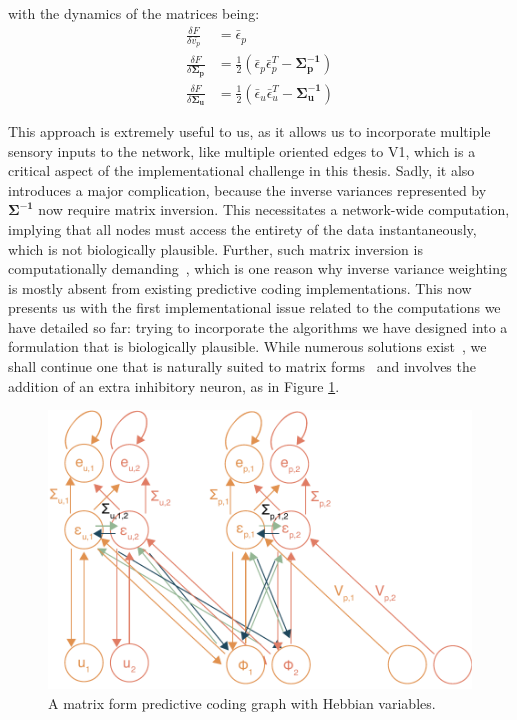 with the dynamics of the matrices being:
\begin{equation}
\label{eq_pc_matrix}
    \begin{aligned}
        \frac{\delta F}{\delta \bar{v_p}} &= \bar{\epsilon}_p \\
        \frac{\delta F}{\delta \boldsymbol{\Sigma_p}} &= \frac{1}{2}(\bar{\epsilon}_p\bar{\epsilon}_p^T - \boldsymbol{\Sigma_p^{-1}}) \\
        \frac{\delta F}{\delta \boldsymbol{\Sigma_u}} &= \frac{1}{2}(\bar{\epsilon}_u\bar{\epsilon}_u^T - \boldsymbol{\Sigma_u^{-1}})
    \end{aligned}
\end{equation}

This approach is extremely useful to us, as it allows us to incorporate multiple sensory inputs to the network, like multiple oriented edges to \gls{V1}, which is a critical aspect of the implementational challenge in this thesis. Sadly, it also introduces a major complication, because the inverse variances represented by $\boldsymbol{\Sigma^{-1}}$ now require matrix inversion. This necessitates a network-wide computation, implying that all nodes must access the entirety of the data instantaneously, which is not biologically plausible. Further, such matrix inversion is computationally demanding~\cite{csanky1975fast}, which is one reason why inverse variance weighting is mostly absent from existing predictive coding implementations.
This now presents us with the first implementational issue related to the computations we have detailed so far: trying to incorporate the algorithms we have designed into a formulation that is biologically plausible. While numerous solutions exist~\cite{friston2005theory, bogacz2017tutorial, kanai2015cerebral}, we shall continue one that is naturally suited to matrix forms~\cite{bogacz2017tutorial} and involves the addition of an extra inhibitory neuron, as in Figure \ref{fig_chap2_pc_matrix_graphs_inhibitory}.

\begin{figure}[h!tbp]
\vspace{0.5cm}
\centering
\includegraphics[width=.8\textwidth]{fig/chap2_fig_pc_graph_matrix_hebbian.pdf}
\caption[A matrix form predictive coding graph with Hebbian variables.]{A matrix form predictive coding graph with Hebbian variables.}
\label{fig_chap2_pc_matrix_graphs_inhibitory}
\end{figure}

